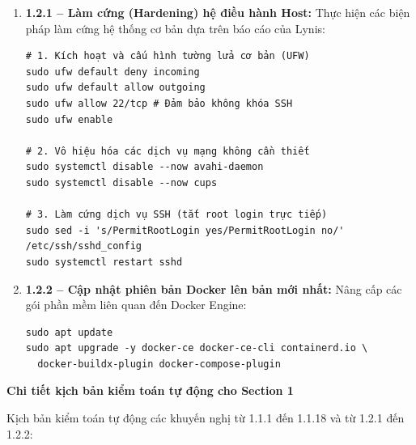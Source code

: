 \begin{enumerate}
{\begin{verbatim}
# Bước 3: Tải lại cấu hình quy tắc của auditd
sudo augenrules --load
\end{verbatim}
}

    \item \textbf{1.2.1 -- Làm cứng (Hardening) hệ điều hành Host:}
    Thực hiện các biện pháp làm cứng hệ thống cơ bản dựa trên báo cáo của Lynis:
{\footnotesize
\begin{verbatim}
# 1. Kích hoạt và cấu hình tường lửa cơ bản (UFW)
sudo ufw default deny incoming
sudo ufw default allow outgoing
sudo ufw allow 22/tcp # Đảm bảo không khóa SSH
sudo ufw enable

# 2. Vô hiệu hóa các dịch vụ mạng không cần thiết
sudo systemctl disable --now avahi-daemon
sudo systemctl disable --now cups

# 3. Làm cứng dịch vụ SSH (tắt root login trực tiếp)
sudo sed -i 's/PermitRootLogin yes/PermitRootLogin no/' /etc/ssh/sshd_config
sudo systemctl restart sshd
\end{verbatim}
}

    \item \textbf{1.2.2 -- Cập nhật phiên bản Docker lên bản mới nhất:}
    Nâng cấp các gói phần mềm liên quan đến Docker Engine:
{\footnotesize
\begin{verbatim}
sudo apt update
sudo apt upgrade -y docker-ce docker-ce-cli containerd.io \
  docker-buildx-plugin docker-compose-plugin
\end{verbatim}
}
\end{enumerate}

\noindent\textbf{Chi tiết kịch bản kiểm toán tự động cho Section 1}

Kịch bản kiểm toán tự động các khuyến nghị từ 1.1.1 đến 1.1.18 và từ 1.2.1 đến 1.2.2:

